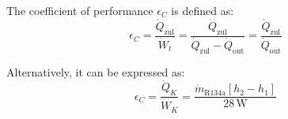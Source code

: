 The coefficient of performance \( \epsilon_C \) is defined as:  
\[
\epsilon_C = \frac{\dot{Q}_{\text{zul}}}{\dot{W}_t} = \frac{\dot{Q}_{\text{zul}}}{\dot{Q}_{\text{zul}} - \dot{Q}_{\text{out}}} = \frac{\dot{Q}_{\text{zul}}}{\dot{Q}_{\text{out}}}
\]

Alternatively, it can be expressed as:  
\[
\epsilon_C = \frac{\dot{Q}_K}{\dot{W}_K} = \frac{\dot{m}_{\text{R134a}} \left[ h_2 - h_1 \right]}{28 \, \text{W}}
\]